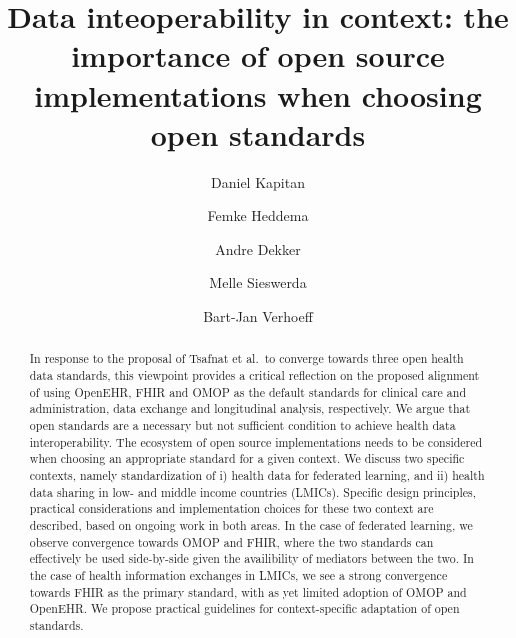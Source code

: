 \documentclass[
  authoryear]{elsarticle}
\begin{document}
\begin{frontmatter}
\title{Data inteoperability in context: the importance of open source
implementations when choosing open standards}
\author[1,2,3]{Daniel Kapitan%
%
}
\author[2]{Femke Heddema%
%
}

\author[4]{Andre Dekker%
%
}

\author[5,4]{Melle Sieswerda%
%
}

\author[6]{Bart-Jan Verhoeff%
%
}








        
\begin{abstract}
In response to the proposal of Tsafnat et al.~to converge towards three
open health data standards, this viewpoint provides a critical
reflection on the proposed alignment of using OpenEHR, FHIR and OMOP as
the default standards for clinical care and administration, data
exchange and longitudinal analysis, respectively. We argue that open
standards are a necessary but not sufficient condition to achieve health
data interoperability. The ecosystem of open source implementations
needs to be considered when choosing an appropriate standard for a given
context. We discuss two specific contexts, namely standardization of i)
health data for federated learning, and ii) health data sharing in low-
and middle income countries (LMICs). Specific design principles,
practical considerations and implementation choices for these two
context are described, based on ongoing work in both areas. In the case
of federated learning, we observe convergence towards OMOP and FHIR,
where the two standards can effectively be used side-by-side given the
availibility of mediators between the two. In the case of health
information exchanges in LMICs, we see a strong convergence towards FHIR
as the primary standard, with as yet limited adoption of OMOP and
OpenEHR. We propose practical guidelines for context-specific adaptation
of open standards.
\end{abstract}






\end{frontmatter}
\end{document}

